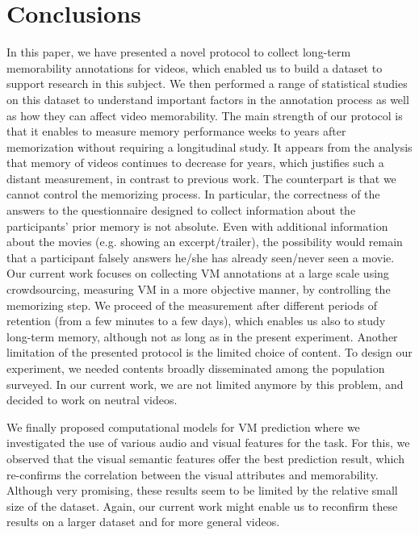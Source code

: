 \documentclass[sigconf]{acmart}
\begin{document}
\section{Conclusions}
\label{conclusions}
In this paper, we have presented a novel protocol to collect long-term memorability annotations for videos, which enabled us to build a dataset to support research in this subject.
We then performed a range of statistical studies on this dataset to understand important factors in the annotation process as well as how they can affect video memorability.
The main strength of our protocol is that it enables to measure memory performance weeks to years after memorization without requiring a longitudinal study.
It appears from the analysis that memory of videos continues to decrease for years, which justifies such a distant measurement, in contrast to previous work.
The counterpart is that we cannot control the memorizing process.
In particular, the correctness of the answers to the questionnaire designed to collect information about the participants' prior memory is not absolute.
Even with additional information about the movies (e.g. showing an excerpt/trailer), the possibility would remain that a participant falsely answers he/she has already seen/never seen a movie.
Our current work focuses on collecting VM annotations at a large scale using crowdsourcing, measuring VM in a more objective manner, by controlling the memorizing step.
We proceed of the measurement after different periods of retention (from a few minutes to a few days), which enables us also to study long-term memory, although not as long as in the present experiment. 
Another limitation of the presented protocol is the limited choice of content.
To design our experiment, we needed contents broadly disseminated among the population surveyed.
In our current work, we are not limited anymore by this problem, and decided to work on neutral videos.

We finally proposed computational models for VM prediction where we investigated the use of various audio and visual features for the task.
For this, we observed that the visual semantic features offer the best prediction result, which re-confirms the correlation between the visual attributes and memorability.
Although very promising, these results seem to be limited by the relative small size of the dataset.
Again, our current work might enable us to reconfirm these results on a larger dataset and for more general videos.
\end{document}

